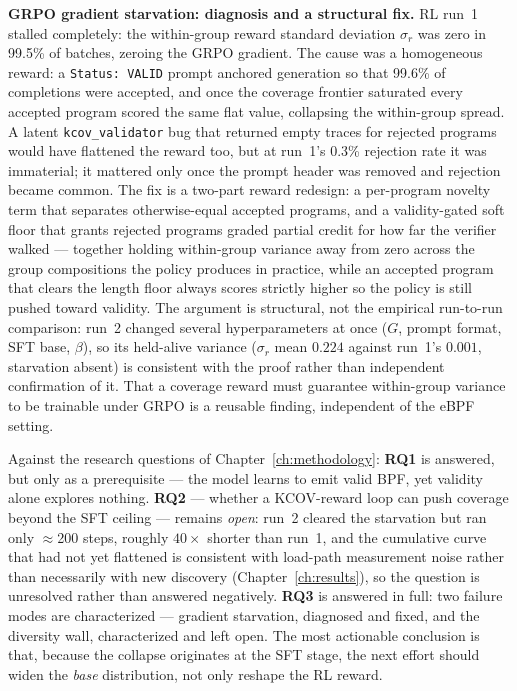 \textbf{GRPO gradient starvation: diagnosis and a structural fix.}
RL run~1 stalled completely: the within-group reward standard deviation $\sigma_r$
was zero in 99.5\% of batches, zeroing the GRPO gradient. The cause was a
homogeneous reward: a \texttt{Status:~VALID} prompt anchored generation so that
99.6\% of completions were accepted, and once the coverage frontier saturated every
accepted program scored the same flat value, collapsing the within-group spread. A
latent \texttt{kcov\_validator} bug that returned empty traces for rejected programs
would have flattened the reward too, but at run~1's 0.3\% rejection rate it was
immaterial; it mattered only once the prompt header was removed and rejection became
common. The fix is a two-part reward redesign: a per-program novelty term that
separates otherwise-equal accepted programs, and a validity-gated soft floor that
grants rejected programs graded partial credit for how far the verifier walked ---
together holding within-group variance away from zero across the group compositions
the policy produces in practice, while an accepted program that clears the length
floor always scores strictly higher so the policy is still pushed toward validity.
The argument is structural, not the empirical run-to-run comparison: run~2 changed
several hyperparameters at once
($G$, prompt format, SFT base, $\beta$), so its held-alive variance ($\sigma_r$ mean
$0.224$ against run~1's $0.001$, starvation absent) is consistent with the proof
rather than independent confirmation of it. That a coverage reward must guarantee
within-group variance to be trainable under GRPO is a reusable finding, independent
of the eBPF setting.

\medskip
Against the research questions of Chapter~\ref{ch:methodology}: \textbf{RQ1} is
answered, but only as a prerequisite --- the model learns to emit valid BPF, yet
validity alone explores nothing. \textbf{RQ2} --- whether a KCOV-reward loop can
push coverage beyond the SFT ceiling --- remains \emph{open}: run~2 cleared the
starvation but ran only $\approx$200 steps, roughly $40\times$ shorter than run~1,
and the cumulative curve that had not yet flattened is consistent with load-path
measurement noise rather than necessarily with new discovery
(Chapter~\ref{ch:results}), so the question is unresolved rather than answered
negatively.
\textbf{RQ3} is answered in full: two failure modes are characterized --- gradient
starvation, diagnosed and fixed, and the diversity wall, characterized and left
open. The most actionable conclusion is that, because the collapse originates at
the SFT stage, the next effort should widen the \emph{base} distribution, not only
reshape the RL reward.

